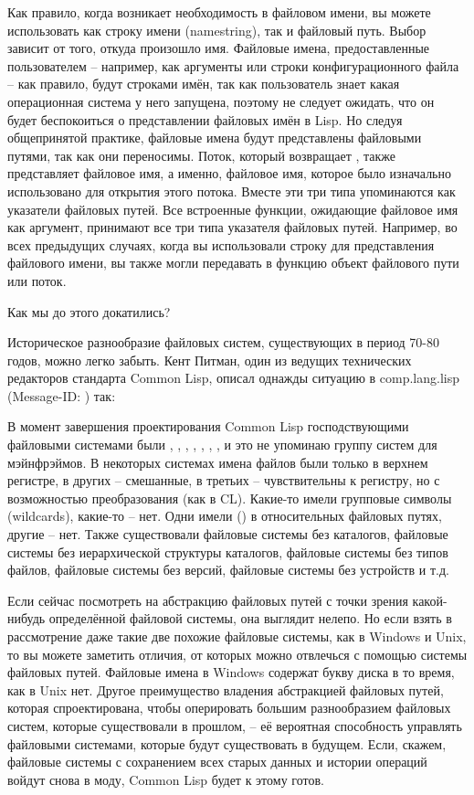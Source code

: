 Как правило, когда возникает необходимость в файловом имени, вы можете использовать как
строку имени (namestring), так и файловый путь. Выбор зависит от того, откуда произошло
имя. Файловые имена, предоставленные пользователем -- например, как аргументы или строки
конфигурационного файла -- как правило, будут строками имён, так как пользователь знает
какая операционная система у него запущена, поэтому не следует ожидать, что он будет
беспокоиться о представлении файловых имён в Lisp. Но следуя общепринятой практике,
файловые имена будут представлены файловыми путями, так как они переносимы. Поток, который
возвращает , также представляет файловое имя, а именно, файловое имя, которое
было изначально использовано для открытия этого потока. Вместе эти три типа упоминаются
как указатели файловых путей. Все встроенные функции, ожидающие файловое имя как аргумент,
принимают все три типа указателя файловых путей. Например, во всех предыдущих случаях,
когда вы использовали строку для представления файлового имени, вы также могли передавать
в функцию объект файлового пути или поток.

Как мы до этого докатились?

Историческое разнообразие файловых систем, существующих в период 70-80 годов, можно легко
забыть. Кент Питман, один из ведущих технических редакторов стандарта Common Lisp, описал
однажды ситуацию в comp.lang.lisp (Message-ID: ) так:

В момент завершения проектирования Common Lisp господствующими файловыми системами были
, , , , , , , и это не упоминаю группу систем для мэйнфрэймов. В некоторых
системах имена файлов были только в верхнем регистре, в других -- смешанные, в третьих --
чувствительны к регистру, но с возможностью преобразования (как в CL). Какие-то имели
групповые символы (wildcards), какие-то -- нет. Одни имели  () в
относительных файловых путях, другие -- нет. Также существовали файловые системы без
каталогов, файловые системы без иерархической структуры каталогов, файловые системы без
типов файлов, файловые системы без версий, файловые системы без устройств и т.д.

Если сейчас посмотреть на абстракцию файловых путей с точки зрения какой-нибудь
определённой файловой системы, она выглядит нелепо. Но если взять в рассмотрение даже
такие две похожие файловые системы, как в Windows и Unix, то вы можете заметить отличия,
от которых можно отвлечься с помощью системы файловых путей. Файловые имена в Windows
содержат букву диска в то время, как в Unix нет. Другое преимущество владения абстракцией
файловых путей, которая спроектирована, чтобы оперировать большим разнообразием файловых
систем, которые существовали в прошлом, -- её вероятная способность управлять файловыми
системами, которые будут существовать в будущем. Если, скажем, файловые системы с
сохранением всех старых данных и истории операций войдут снова в моду, Common Lisp будет к
этому готов.

